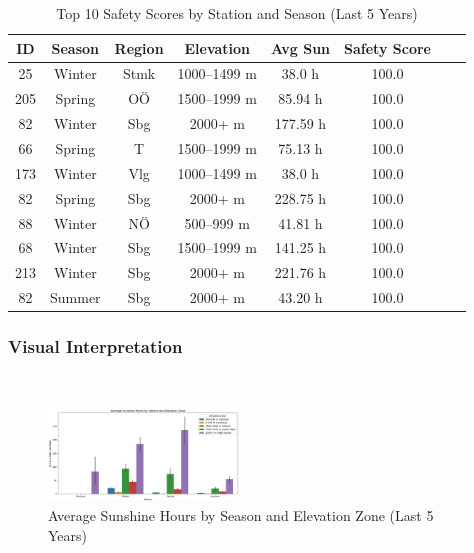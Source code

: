 \begin{table}[H]
    \centering
    \begin{tabular}{|c|c|c|c|c|c|c|c|}
        \hline
        \textbf{ID} & \textbf{Season} & \textbf{Region} & \textbf{Elevation} & \textbf{Avg Sun} & \textbf{Safety Score}         \\
        \hline
        25          & Winter          & Stmk            & 1000–1499 m        & 38.0 h                                             & 100.0 \\
        205         & Spring          & OÖ              & 1500–1999 m        & 85.94 h                                            & 100.0 \\
        82          & Winter          & Sbg             & 2000+ m            & 177.59 h                                           & 100.0 \\
        66          & Spring          & T               & 1500–1999 m        & 75.13 h                                            & 100.0 \\
        173         & Winter          & Vlg             & 1000–1499 m        & 38.0 h                                             & 100.0 \\
        82          & Spring          & Sbg             & 2000+ m            & 228.75 h                                           & 100.0 \\
        88          & Winter          & NÖ              & 500–999 m          & 41.81 h                                            & 100.0 \\
        68          & Winter          & Sbg             & 1500–1999 m        & 141.25 h                                           & 100.0 \\
        213         & Winter          & Sbg             & 2000+ m            & 221.76 h                                           & 100.0 \\
        82          & Summer          & Sbg             & 2000+ m            & 43.20 h                                            & 100.0 \\
        \hline
    \end{tabular}
    \caption{Top 10 Safety Scores by Station and Season (Last 5 Years)}
    \label{tab:top_scores}
\end{table}

\subsubsection{Visual Interpretation}\leavevmode \\
\begin{figure}[H]
    \centering
    \includegraphics[width=0.45\textwidth]{img/sunshine_by_season_zone.png}
    \caption{Average Sunshine Hours by Season and Elevation Zone (Last 5 Years)}
    \label{fig:sunshine}
\end{figure}

